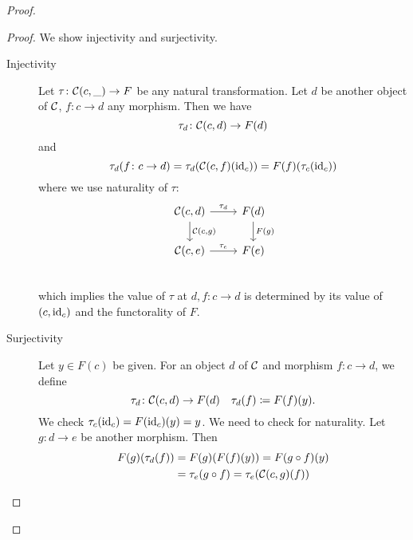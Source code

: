 \documentclass[language=english]{TemplateLecture}
\begin{document}
\begin{proof}
    \begin{proof}
        We show injectivity and surjectivity.
        \begin{description}
            \item[Injectivity] Let \(\tau\colon \mathcal{C}(c,\_) \to F\) be any natural transformation. Let \(d\) be another object of \(\mathcal{C}\), \(f\colon c\to d\) any morphism. Then we have
            \[\tau_d\colon \mathcal{C}(c,d) \to F(d)\]
            and
            \[\tau_d(f\colon c \to d) = \tau_d(\mathcal{C}(c,f)(\operatorname{id}_c)) = F(f) (\tau_c(\operatorname{id}_c))\]
            where we use naturality of \(\tau\):
            \[\begin{tikzcd}
                {\cC(c,d)} \ar[r, "\tau_d"] \ar[d, "{\cC(c,g)}"] & F(d) \ar[d, "F(g)"] \\
                {\cC(c,e)} \ar[r, "\tau_e"] & F(e) \\
            \end{tikzcd}\]
            which implies the value of \(\tau\) at \(d,f\colon c\to d\) is determined by its value of \((c, \operatorname{id}_c)\) and the functorality of \(F\).
            \item[Surjectivity] Let \(y \in F(c)\) be given. For an object \(d\) of \(\mathcal{C}\) and morphism \(f\colon c \to d\), we define
            \[\tau_d\colon \mathcal{C}(c,d) \to F(d) \quad \tau_d(f) \coloneq F(f)(y).\]
            We check \(\tau_c(\operatorname{id}_c) = F(\operatorname{id}_c)(y) = y\).
            We need to check for naturality. Let \(g\colon d \to e \) be another morphism. Then
            \[\begin{split}
                F(g)(\tau_d(f)) &= F(g)(F(f)(y)) = F(g\circ f)(y) \\
                &= \tau_e(g\circ f) = \tau_e(\mathcal{C}(c,g)(f)) \\
            \end{split}\]
         \end{description}
    \end{proof}


\end{proof}
\end{document}
